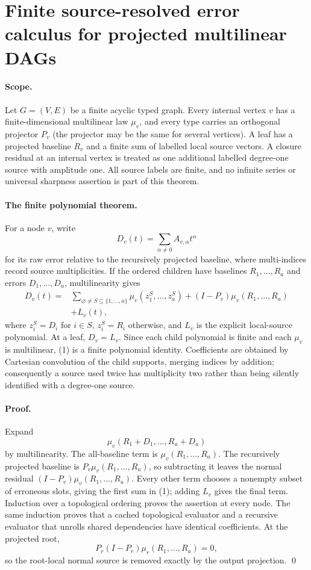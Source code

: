 \section*{Finite source-resolved error calculus for projected multilinear DAGs}
\label{sec:finite-source-resolved-error-calculus}

\paragraph{Scope.}
Let $G=(V,E)$ be a finite acyclic typed graph.  Every internal vertex $v$
has a finite-dimensional multilinear law $\mu_v$, and every type carries an
orthogonal projector $P_v$ (the projector may be the same for several
vertices).  A leaf has a projected baseline $R_v$ and a finite sum of labelled
local source vectors.  A closure residual at an internal vertex is treated as
one additional labelled degree-one source with amplitude one.  All source
labels are finite, and no infinite series or universal sharpness assertion is
part of this theorem.

\paragraph{The finite polynomial theorem.}
For a node $v$, write
\[
  D_v(t)=\sum_{\alpha\ne0} A_{v,\alpha}t^\alpha
\]
for its raw error relative to the recursively projected baseline, where
multi-indices record source multiplicities.  If the ordered children have
baselines $R_1,\ldots,R_a$ and errors $D_1,\ldots,D_a$, multilinearity gives
\[
\begin{split}
 D_v(t)={}&
 \sum_{\varnothing\ne S\subseteq\{1,\ldots,a\}}
 \mu_v(z^S_1,\ldots,z^S_a)
 +(I-P_v)\mu_v(R_1,\ldots,R_a)\\
 &+L_v(t),
\end{split}
\tag{1}
\]
where $z_i^S=D_i$ for $i\in S$, $z_i^S=R_i$ otherwise, and $L_v$ is the
explicit local-source polynomial.  At a leaf, $D_v=L_v$.  Since each child
polynomial is finite and each $\mu_v$ is multilinear, (1) is a finite
polynomial identity.  Coefficients are obtained by Cartesian convolution of
the child supports, merging indices by addition; consequently a source used
twice has multiplicity two rather than being silently identified with a
degree-one source.

\paragraph{Proof.}
Expand
\[
 \mu_v(R_1+D_1,\ldots,R_a+D_a)
\]
by multilinearity.  The all-baseline term is
$\mu_v(R_1,\ldots,R_a)$.  The recursively projected baseline is
$P_v\mu_v(R_1,\ldots,R_a)$, so subtracting it leaves the normal residual
$(I-P_v)\mu_v(R_1,\ldots,R_a)$.  Every other term chooses a nonempty subset
of erroneous slots, giving the first sum in (1); adding $L_v$ gives the final
term.  Induction over a topological ordering proves the assertion at every
node.  The same induction proves that a cached topological evaluator and a
recursive evaluator that unrolls shared dependencies have identical
coefficients.  At the projected root,
\[
 P_r(I-P_r)\mu_r(R_1,\ldots,R_a)=0,
\]
so the root-local normal source is removed exactly by the output projection.
\qed

